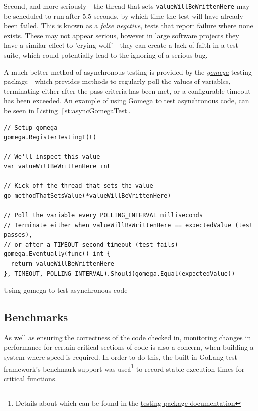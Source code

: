 Second, and more seriously - the thread that sets
\texttt{valueWillBeWrittenHere} may be scheduled to run after 5.5
seconds, by which time the test will have already been failed. This is known
as a \emph{\gls{false negative}}, tests that report failure where none exists.
These may not appear serious, however in large software projects they have a
similar effect to 'crying wolf' - they can create a lack of faith in a test
suite, which could potentially lead to the ignoring of a serious bug.

A much better method of asynchronous testing is provided by the
\href{https://github.com/onsi/gomega}{\emph{gomega}} testing package - which
provides methods to regularly poll the values of variables, terminating either
after the pass criteria has been met, or a configurable timeout has been
exceeded. An example of using Gomega to test asynchronous code, can be seen in
Listing~\ref{lst:asyncGomegaTest}.

\begin{listing}[H]
  \centering
  \begin{verbatim}
// Setup gomega
gomega.RegisterTestingT(t)

// We'll inspect this value
var valueWillBeWrittenHere int

// Kick off the thread that sets the value
go methodThatSetsValue(*valueWillBeWrittenHere)

// Poll the variable every POLLING_INTERVAL milliseconds
// Terminate either when valueWillBeWrittenHere == expectedValue (test passes),
// or after a TIMEOUT second timeout (test fails)
gomega.Eventually(func() int {
  return valueWillBeWrittenHere
}, TIMEOUT, POLLING_INTERVAL).Should(gomega.Equal(expectedValue))
  \end{verbatim}
  \caption{Using gomega to test asynchronous code}
  \label{lst:asyncGomegaTest}
\end{listing}

\subsection{Benchmarks}
\label{sub:benchmarks}

As well as ensuring the correctness of the code checked in, monitoring changes
in performance for certain critical sections of code is also a concern, when
building a system where speed is required. In order to do this, the built-in
GoLang test framework's benchmark support was used\footnote{Details about which
can be found in the \href{https://golang.org/pkg/testing/}{testing package
documentation}} to record stable execution times for critical functions.


